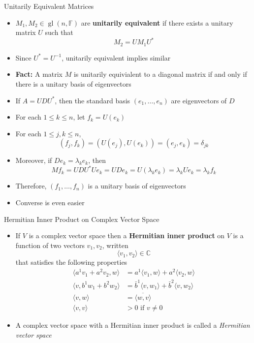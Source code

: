 \documentclass[usenames,dvipsnames,10pt]{beamer}
\newcommand\C{\mathbb{C}}
\newcommand\F{\mathbb{F}}
\newcommand{\gl}{\operatorname{gl}}
\begin{document}
\begin{frame}
  {Unitarily Equivalent Matrices}

  \begin{itemize}
  \item $M_1, M_2 \in \gl(n,\F)$ are {\bf unitarily equivalent} if there exists a unitary matrix $U$ such that
    \[
      M_2 = UM_1U^*
    \]
  \item Since $U^* = U^{-1}$, unitarily equivalent implies similar
  \item {\bf Fact: }A matrix $M$ is unitarily equivialent to a diagonal matrix if and only if there is a unitary basis of eigenvectors
  \item If $A = UDU^*$, then the standard basis $(e_1, \dots, e_n)$ are eigenvectors of $D$
  \item For each $1 \le k \le n$, let $f_k = U(e_k)$
  \item For each $1 \le j,k \le n$,
    \[
      (f_j,f_k) = (U(e_j),U(e_k)) = (e_j,e_k) = \delta_{jk}
    \]
  \item Moreover, if $De_k = \lambda_k e_k$, then
    \[
      Mf_k = UDU^*Ue_k = UDe_k = U(\lambda_k e_k) = \lambda_k Ue_k = \lambda_kf_k
    \]
  \item Therefore, $(f_1, \dots, f_n)$ is a unitary basis of eigenvectors
  \item Converse is even easier
  \end{itemize}
\end{frame}

\begin{frame}
  {Hermitian Inner Product on Complex Vector Space}

  \begin{itemize}
  \item If $V$ is a complex vector space then a {\bf Hermitian inner product} on $V$ is a function of two vectors $v_1, v_2$, written
    \[
      \langle v_1,v_2\rangle \in \C
    \]
    that satisfies the following properties
    \begin{align*}
      \langle a^1v_1 + a^2v_2, w\rangle &= a^1\langle v_1,w\rangle + a^2\langle v_2,w\rangle\\
      \langle v, b^1w_1 + b^2w_2\rangle &= \bar{b}^1\langle v, w_1\rangle + \bar{b}^2\langle v, w_2\rangle\\
      \langle v, w\rangle &= \overline{\langle w, v\rangle}\\
      \langle v,v\rangle &> 0\text{ if }v \ne 0
    \end{align*}
  \item A complex vector space with a Hermitian inner product is called a {\em Hermitian vector space}
  \end{itemize}
\end{frame}
\end{document}
